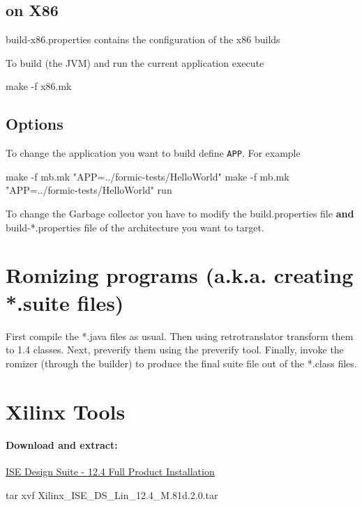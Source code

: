 \documentclass[
a4paper,
12pt,
]{report}
\begin{document}
\subsection{on X86}
build-x86.properties contains the configuration of the x86 builds

To build (the JVM) and run the current application execute

\begin{bash}
make -f x86.mk
\end{bash}

\subsection{Options}
To change the application you want to build define \verb!APP!. For
example

\begin{bash}
make -f mb.mk "APP=../formic-tests/HelloWorld"
make -f mb.mk "APP=../formic-tests/HelloWorld" run
\end{bash}

To change the Garbage collector you have to modify the
build.properties file \textbf{and} build-*.properties file of the
architecture you want to target.

\section{Romizing programs (a.k.a. creating *.suite files)}

First compile the *.java files as usual. Then using retrotranslator
transform them to 1.4 classes. Next, preverify them using the
preverify tool. Finally, invoke the romizer (through the builder) to
produce the final suite file out of the *.class files.

\section{Xilinx Tools}
\label{sec:xilinx-tools}

\paragraph{Download and extract:}
\href{http://www.xilinx.com/support/download/index.html/content/xilinx/en/downloadNav/design-tools/v12_4.html)}
{ISE  Design Suite - 12.4 Full Product Installation}

\begin{bash}
tar xvf Xilinx_ISE_DS_Lin_12.4_M.81d.2.0.tar
\end{bash}
\end{document}
